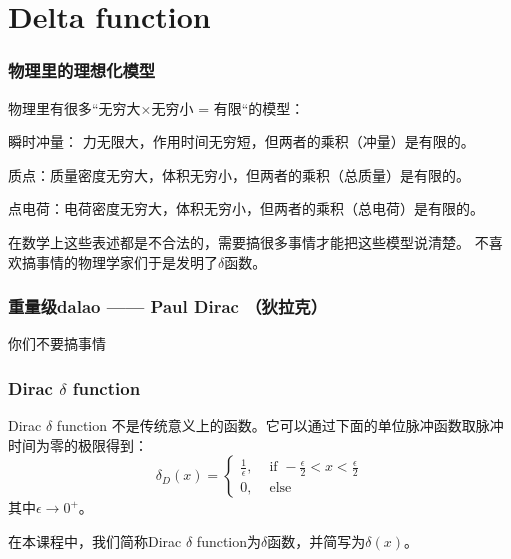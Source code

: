 \documentclass[CJK]{beamer}
\date{}
\begin{document}
  \bch
{}

\begin{frame}
  \tableofcontents
\end{frame}

\section{Delta function}

\begin{frame}
  \frametitle{物理里的理想化模型}
  
  物理里有很多“无穷大$\times$无穷小 = 有限“的模型：
  \bitem
\item{瞬时冲量： 力无限大，作用时间无穷短，但两者的乘积（冲量）是有限的。}
\item{质点：质量密度无穷大，体积无穷小，但两者的乘积（总质量）是有限的。}
\item{点电荷：电荷密度无穷大，体积无穷小，但两者的乘积（总电荷）是有限的。}
  \eitem

  \skiplines
  
  在数学上这些表述都是不合法的，需要搞很多事情才能把这些模型说清楚。 不喜欢搞事情的物理学家们于是发明了{\blue $\delta$函数}。
  
\end{frame}

\begin{frame}
  \frametitle{重量级dalao —— Paul Dirac （狄拉克）}
  
  \bcenter

  你们不要搞事情
  \ecenter
  
\end{frame}
  
\begin{frame}
  \frametitle{Dirac $\delta$ function}
  
  \emini
  Dirac $\delta$ function 不是传统意义上的函数。它可以通过下面的{\blue 单位脉冲函数取脉冲时间为零的极限}得到：
  $$\delta_D(x) = \left\{\begin{array}{ll} \frac{1}{\epsilon}, & \text{ if } -\frac{\epsilon}{2}<x<\frac{\epsilon}{2} \\  0, & \text{ else}\end{array}\right. $$
  其中$\epsilon\rightarrow 0^+$。  
  \emini

  在本课程中，我们{\blue 简称Dirac $\delta$ function为$\delta$函数，并简写为$\delta(x)$}。
  
\end{frame}
\end{document}
